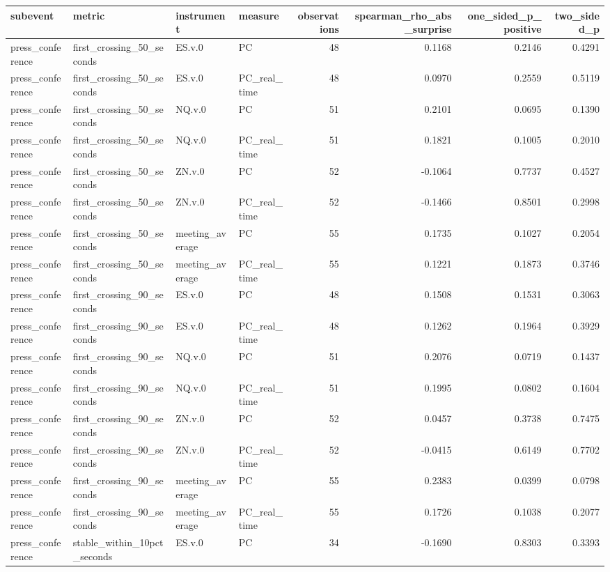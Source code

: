 \begin{tabular}{llllrrrr}
\toprule
subevent & metric & instrument & measure & observations & spearman_rho_abs_surprise & one_sided_p_positive & two_sided_p \\
\midrule
press_conference & first_crossing_50_seconds & ES.v.0 & PC & 48 & 0.1168 & 0.2146 & 0.4291 \\
press_conference & first_crossing_50_seconds & ES.v.0 & PC_real_time & 48 & 0.0970 & 0.2559 & 0.5119 \\
press_conference & first_crossing_50_seconds & NQ.v.0 & PC & 51 & 0.2101 & 0.0695 & 0.1390 \\
press_conference & first_crossing_50_seconds & NQ.v.0 & PC_real_time & 51 & 0.1821 & 0.1005 & 0.2010 \\
press_conference & first_crossing_50_seconds & ZN.v.0 & PC & 52 & -0.1064 & 0.7737 & 0.4527 \\
press_conference & first_crossing_50_seconds & ZN.v.0 & PC_real_time & 52 & -0.1466 & 0.8501 & 0.2998 \\
press_conference & first_crossing_50_seconds & meeting_average & PC & 55 & 0.1735 & 0.1027 & 0.2054 \\
press_conference & first_crossing_50_seconds & meeting_average & PC_real_time & 55 & 0.1221 & 0.1873 & 0.3746 \\
press_conference & first_crossing_90_seconds & ES.v.0 & PC & 48 & 0.1508 & 0.1531 & 0.3063 \\
press_conference & first_crossing_90_seconds & ES.v.0 & PC_real_time & 48 & 0.1262 & 0.1964 & 0.3929 \\
press_conference & first_crossing_90_seconds & NQ.v.0 & PC & 51 & 0.2076 & 0.0719 & 0.1437 \\
press_conference & first_crossing_90_seconds & NQ.v.0 & PC_real_time & 51 & 0.1995 & 0.0802 & 0.1604 \\
press_conference & first_crossing_90_seconds & ZN.v.0 & PC & 52 & 0.0457 & 0.3738 & 0.7475 \\
press_conference & first_crossing_90_seconds & ZN.v.0 & PC_real_time & 52 & -0.0415 & 0.6149 & 0.7702 \\
press_conference & first_crossing_90_seconds & meeting_average & PC & 55 & 0.2383 & 0.0399 & 0.0798 \\
press_conference & first_crossing_90_seconds & meeting_average & PC_real_time & 55 & 0.1726 & 0.1038 & 0.2077 \\
press_conference & stable_within_10pct_seconds & ES.v.0 & PC & 34 & -0.1690 & 0.8303 & 0.3393 \\

\end{tabular}
